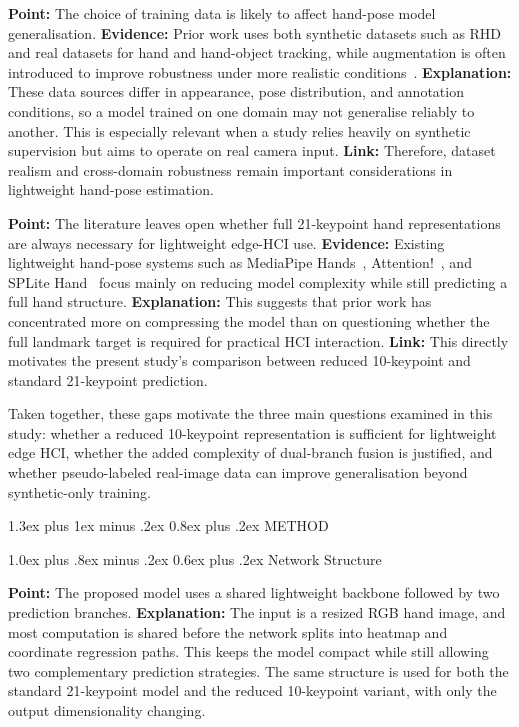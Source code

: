 \documentclass[10pt,letterpaper]{article}
\makeatletter
\renewcommand\section{\@startsection{section}{1}{\z@}%
  {1.3ex plus 1ex minus .2ex}%
  {0.8ex plus .2ex}%
  {\centering\normalfont\small\scshape}}
\renewcommand\subsection{\@startsection{subsection}{2}{\z@}%
  {1.0ex plus .8ex minus .2ex}%
  {0.6ex plus .2ex}%
  {\normalfont\itshape}}
\makeatother
\begin{document}
\medskip
\noindent\textbf{Point:} The choice of training data is likely to affect hand-pose model generalisation.  
\textbf{Evidence:} Prior work uses both synthetic datasets such as RHD and real datasets for hand and hand-object tracking, while augmentation is often introduced to improve robustness under more realistic conditions~\cite{handobjectgcn,lightweightgcnhand,handaugment}.  
\textbf{Explanation:} These data sources differ in appearance, pose distribution, and annotation conditions, so a model trained on one domain may not generalise reliably to another. This is especially relevant when a study relies heavily on synthetic supervision but aims to operate on real camera input.  
\textbf{Link:} Therefore, dataset realism and cross-domain robustness remain important considerations in lightweight hand-pose estimation.

\medskip
\noindent\textbf{Point:} The literature leaves open whether full 21-keypoint hand representations are always necessary for lightweight edge-HCI use.  
\textbf{Evidence:} Existing lightweight hand-pose systems such as MediaPipe Hands~\cite{mediapipe}, Attention!~\cite{attentionlite}, and SPLite Hand~\cite{splitehand} focus mainly on reducing model complexity while still predicting a full hand structure.  
\textbf{Explanation:} This suggests that prior work has concentrated more on compressing the model than on questioning whether the full landmark target is required for practical HCI interaction.  
\textbf{Link:} This directly motivates the present study's comparison between reduced 10-keypoint and standard 21-keypoint prediction.

\medskip
Taken together, these gaps motivate the three main questions examined in this study: whether a reduced 10-keypoint representation is sufficient for lightweight edge HCI, whether the added complexity of dual-branch fusion is justified, and whether pseudo-labeled real-image data can improve generalisation beyond synthetic-only training.


\section{METHOD}

\subsection{Network Structure}

\noindent\textbf{Point:} The proposed model uses a shared lightweight backbone followed by two prediction branches.  
\textbf{Explanation:} The input is a resized RGB hand image, and most computation is shared before the network splits into heatmap and coordinate regression paths. This keeps the model compact while still allowing two complementary prediction strategies. The same structure is used for both the standard 21-keypoint model and the reduced 10-keypoint variant, with only the output dimensionality changing.
\end{document}
